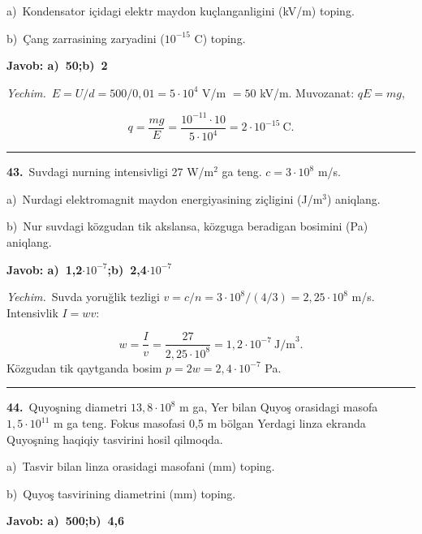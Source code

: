 \documentclass[11pt,a4paper]{article}
\begin{document}
\noindent\hspace*{4mm}a)\ Kondensator içidagi elektr maydon kuçlanganligini (kV/m) toping.\par
\noindent\hspace*{4mm}b)\ Çang zarrasining zaryadini ($10^{-15}$ C) toping.\par
\noindent\colorbox{gray!12}{\parbox{\dimexpr\linewidth-2\fboxsep}{\textbf{Javob: a)\ 50;\quad b)\ 2}}}\par\smallskip
\noindent\textit{Yechim.}\ $E=U/d=500/0{,}01=5\cdot10^4$ V/m $=50$ kV/m. Muvozanat: $qE=mg$,\par
\[q=\frac{mg}{E}=\frac{10^{-11}\cdot10}{5\cdot10^4}=2\cdot10^{-15}\ \text{C}.\]\par\medskip\hrule\medskip
{}\noindent\textbf{43.}\ Suvdagi nurning intensivligi 27 W/m$^2$ ga teng. $c=3\cdot10^8$ m/s.\par
\noindent\hspace*{4mm}a)\ Nurdagi elektromagnit maydon energiyasining ziçligini (J/m$^3$) aniqlang.\par
\noindent\hspace*{4mm}b)\ Nur suvdagi közgudan tik akslansa, közguga beradigan bosimini (Pa) aniqlang.\par
\noindent\colorbox{gray!12}{\parbox{\dimexpr\linewidth-2\fboxsep}{\textbf{Javob: a)\ 1,2$\cdot10^{-7}$;\quad b)\ 2,4$\cdot10^{-7}$}}}\par\smallskip
\noindent\textit{Yechim.}\ Suvda yoruğlik tezligi $v=c/n=3\cdot10^8/(4/3)=2{,}25\cdot10^8$ m/s. Intensivlik $I=wv$:\par
\[w=\frac{I}{v}=\frac{27}{2{,}25\cdot10^8}=1{,}2\cdot10^{-7}\ \text{J/m}^3.\]
Közgudan tik qaytganda bosim $p=2w=2{,}4\cdot10^{-7}$ Pa.\par\par\medskip\hrule\medskip
{}\noindent\textbf{44.}\ Quyoşning diametri $13,8\cdot10^{8}$ m ga, Yer bilan Quyoş orasidagi masofa $1,5\cdot10^{11}$ m ga teng. Fokus masofasi 0,5 m bölgan Yerdagi linza ekranda Quyoşning haqiqiy tasvirini hosil qilmoqda.\par
\noindent\hspace*{4mm}a)\ Tasvir bilan linza orasidagi masofani (mm) toping.\par
\noindent\hspace*{4mm}b)\ Quyoş tasvirining diametrini (mm) toping.\par
\noindent\colorbox{gray!12}{\parbox{\dimexpr\linewidth-2\fboxsep}{\textbf{Javob: a)\ 500;\quad b)\ 4,6}}}\par\smallskip
\end{document}
